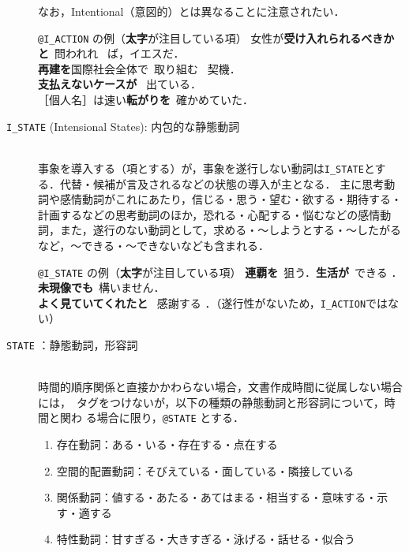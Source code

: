 \documentclass[japanese]{jnlp_1.4}
\newcommand{\modified}[1]{}
\def\event{}
\def\eventc{}
\begin{document}
\begin{description}
なお，Intentional（意図的）とは異なることに注意されたい．

\begin{itembox}[l]{\event\texttt{@I\_ACTION} の例（{\bf 太字}が注目している項）}  
\small
女性が{\bf 受け入れられるべきかと}\event\ 問われれ \eventc\ ば，イエスだ．\\
{\bf 再建を}国際社会全体で\event\ 取り組む \eventc\ 契機．\\
{\bf 支払えないケースが} \event\ 出ている\eventc．\\
［個人名］は速い{\bf 転がりを}\event\ 確かめていた\eventc．
\end{itembox}


\item[{\tt I\_STATE} (Intensional States): 内包的な静態動詞]\mbox{}\\
事象を導入する（項とする）が，事象を遂行しない動詞は{\tt I\_STATE}とする．代替・候補が言及されるなどの状態の導入が主となる．
 主に思考動詞や感情動詞がこれにあたり，信じる・思う・望む・欲する・期待する・計画するなどの思考動詞のほか，恐れる・心配する・悩むなどの感情動詞，また，遂行のない動詞として，求める・〜しようとする・〜したがるなど，〜できる・〜できないなども含まれる．

\begin{itembox}[l]{\event\texttt{@I\_STATE} の例（{\bf 太字}が注目している項）}  
\small 
{\bf 連覇を}\event\ 狙う\eventc．{\bf 生活が}\event\ できる \eventc．\\
{\bf 未現像でも}\event\ 構いません\eventc．\\
{\bf よく見ていてくれたと} \event\ 感謝する \eventc．（遂行性がないため，{\tt I\_ACTION}ではない）
\end{itembox}


\item[{\tt STATE} ：静態動詞，形容詞\modified{，形状詞}]\mbox{}\\
時間的順序関係と直接かかわらない場合，文書作成時間に従属しない場合には，\event\ 
タグをつけないが，以下の種類の静態動詞\cite{工藤1995}と形容詞について，時間と関わ
る場合に限り，\event\texttt{@STATE} とする．

\begin{enumerate}
\item 存在動詞：ある・いる・存在する・点在する
\item 空間的配置動詞：そびえている・面している・隣接している
\item 関係動詞：値する・あたる・あてはまる・相当する・意味する・示す・適する
\item 特性動詞：甘すぎる・大きすぎる・泳げる・話せる・似合う
\end{enumerate}


\end{description}
\end{document}

